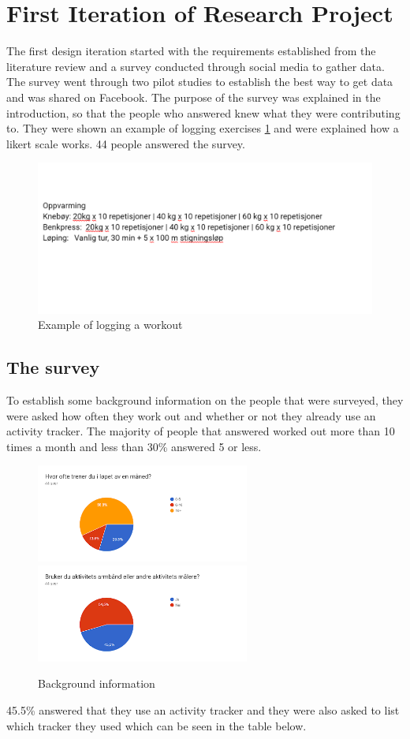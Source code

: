 \section{First Iteration of Research Project}
The first design iteration started with the requirements established from the literature review and a survey conducted through social media to gather data. The survey went through two pilot studies to establish the best way to get data and was shared on Facebook. The purpose of the survey was explained in the introduction, so that the people who answered knew what they were contributing to. They were shown an example of logging exercises \ref{fig:workout log} and were explained how a likert scale works. 44 people answered the survey.
\begin{figure}[H]
    \centering
    \includegraphics[width=120mm]{figures/testtest.png}
    \caption{Example of logging a workout}
    \label{fig:workout log}
\end{figure}
\subsection{The survey} \label{survey}
To establish some background information on the people that were surveyed, they were asked how often they work out and whether or not they already use an activity tracker. The majority of people that answered worked out more than 10 times a month and less than 30\% answered 5 or less.
\begin{figure}[H]%
    \centering
    {{\includegraphics[width=7cm]{figures/testings.png} }}%
    \qquad
     {{\includegraphics[width=7cm]{figures/survey2.png} }}%
    \caption{Background information}%
\end{figure}
45.5\% answered that they use an activity tracker and they were also asked to list which tracker they used which can be seen in the table below. 

